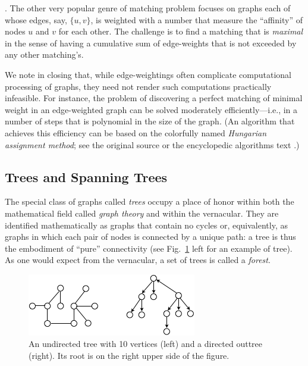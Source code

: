 \bigskip

.
The other very popular genre of matching problem focuses on graphs
each of whose edges, say, $\{u,v\}$, is weighted with a number that
measure the ``affinity'' of  nodes $u$ and $v$ for each other.  The
challenge is to find a matching that is {\em maximal}
 in the sense of having a cumulative
sum of edge-weights that is not exceeded by any other matching's.

We note in closing that, while edge-weightings often complicate
computational processing of graphs, they need not render such
computations practically infeasible.  For instance, the problem of
discovering a perfect matching of minimal weight in an edge-weighted
graph can be solved moderately efficiently---i.e., in a number of
steps that is polynomial in the size of the graph.  (An algorithm that
achieves this efficiency can be based on the colorfully named {\it
  Hungarian assignment method};   see the
original source \cite{Kuhn55} or the encyclopedic algorithms text
\cite{CLRS}.)











\subsection{Trees and Spanning Trees}
\label{sec:Trees}


The special class of graphs called {\it trees} 
 occupy a place of honor within both the mathematical
field called {\it graph theory} and within the vernacular.
They are identified mathematically as graphs that contain no
cycles or, equivalently, as graphs in which each pair of nodes is
connected by a unique path: a tree is thus the embodiment of ``pure''
connectivity (see Fig.~\ref{fig:tree} left for an example of tree).  As one
would expect from the vernacular, a set of trees is called a {\it
  forest}. 
\begin{figure}[hbt]
\begin{center}
       \includegraphics[scale=0.6]{FiguresGraph/tree}
       \caption{An undirected tree with 10 vertices (left) and a directed outtree (right).
       Its root is on the right upper side of the figure.}
  \label{fig:tree}
\end{center}
\end{figure}

